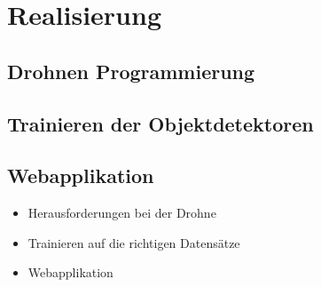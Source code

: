 \chapter{Realisierung}

\section{Drohnen Programmierung}

\section{Trainieren der Objektdetektoren}

\section{Webapplikation}

\begin{itemize}
	\item Herausforderungen bei der Drohne
	\item Trainieren auf die richtigen Datensätze
	\item Webapplikation
\end{itemize}